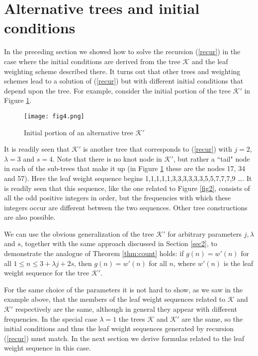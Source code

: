 \documentclass[12pt]{amsart}
\numberwithin{equation}{section}
\numberwithin{theorem}{section}
\numberwithin{table}{section}
\numberwithin{figure}{section}
\begin{document}
\section{Alternative trees and initial conditions} \label{sec3}

In the preceding section we showed how to solve the recursion (\ref{recur}) in the case where the initial conditions are derived from the tree ${\mathcal K}$ and the leaf weighting scheme described there. It turns out that other trees and weighting schemes lead to a solution of (\ref{recur}) but with different initial conditions that depend upon the tree. For example, consider the initial portion of the tree ${\mathcal K}'$ in Figure \ref{fig4}.

\begin{figure}[htpb]
\begin{center}
\texttt{[image: fig4.png]}
\caption{Initial portion of an alternative tree ${\mathcal K}'$} \label{fig4}
\end{center}
\end{figure}

It is readily seen that ${\mathcal K}'$ is another tree that corresponds to (\ref{recur}) with $j=2$, $\lambda=3$ and $s=4$. Note that there is no knot node in ${\mathcal K}'$, but rather a ``tail" node in each of the sub-trees that make it up (in Figure \ref{fig4} these are the nodes 17, 34 and 57). Here the leaf weight sequence begins 1,1,1,1,1,3,3,3,3,3,3,5,5,7,7,7,9 \ldots. It is readily seen that this sequence, like the one related to Figure \ref{fig2}, consists of all the odd positive integers in order, but the frequencies with which these integers occur are different between the two sequences. Other tree constructions are also possible.

We can use the obvious generalization of the tree ${\mathcal K}'$ for arbitrary parameters $j, \lambda$ and $s$, together with the same approach discussed in Section \ref{sec2}, to demonstrate the analogue of Theorem \ref{thm:count} holds: if $g(n)=w'(n)$ for all $1\leq n \leq 3+\lambda j + 2s$, then $g(n)= w'(n)$ for all $n$, where $w'(n)$ is the leaf weight sequence for the tree ${\mathcal K}'$.

For the same choice of the parameters it is not hard to show, as we saw in the example above, that the members of the leaf weight sequences related to ${\mathcal K}$ and ${\mathcal K}'$ respectively are the same, although in general they appear with different frequencies. In the special case $\lambda=1$ the trees ${\mathcal K}$ and ${\mathcal K}'$ are the same, so the initial conditions and thus the leaf weight sequences generated by recursion (\ref{recur}) must match. In the next section we derive formulas related to the leaf weight sequence in this case.
\end{document}
